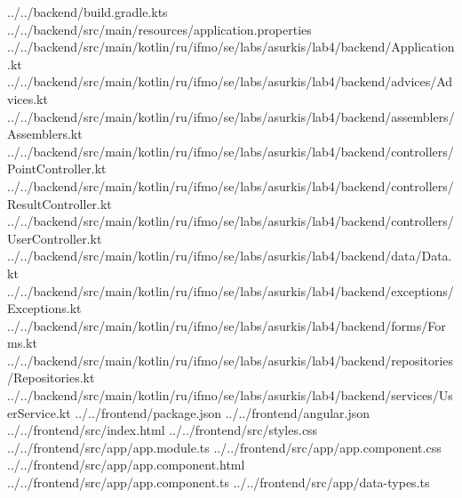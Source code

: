                {../../backend/build.gradle.kts}
         {../../backend/src/main/resources/application.properties}
                 {../../backend/src/main/kotlin/ru/ifmo/se/labs/asurkis/lab4/backend/Application.kt}
                     {../../backend/src/main/kotlin/ru/ifmo/se/labs/asurkis/lab4/backend/advices/Advices.kt}
                  {../../backend/src/main/kotlin/ru/ifmo/se/labs/asurkis/lab4/backend/assemblers/Assemblers.kt}
             {../../backend/src/main/kotlin/ru/ifmo/se/labs/asurkis/lab4/backend/controllers/PointController.kt}
            {../../backend/src/main/kotlin/ru/ifmo/se/labs/asurkis/lab4/backend/controllers/ResultController.kt}
              {../../backend/src/main/kotlin/ru/ifmo/se/labs/asurkis/lab4/backend/controllers/UserController.kt}
                        {../../backend/src/main/kotlin/ru/ifmo/se/labs/asurkis/lab4/backend/data/Data.kt}
                  {../../backend/src/main/kotlin/ru/ifmo/se/labs/asurkis/lab4/backend/exceptions/Exceptions.kt}
                       {../../backend/src/main/kotlin/ru/ifmo/se/labs/asurkis/lab4/backend/forms/Forms.kt}
                {../../backend/src/main/kotlin/ru/ifmo/se/labs/asurkis/lab4/backend/repositories/Repositories.kt}
                 {../../backend/src/main/kotlin/ru/ifmo/se/labs/asurkis/lab4/backend/services/UserService.kt}
                   {../../frontend/package.json}
                   {../../frontend/angular.json}
                     {../../frontend/src/index.html}
                     {../../frontend/src/styles.css}
                  {../../frontend/src/app/app.module.ts}
              {../../frontend/src/app/app.component.css}
             {../../frontend/src/app/app.component.html}
               {../../frontend/src/app/app.component.ts}
                  {../../frontend/src/app/data-types.ts}
